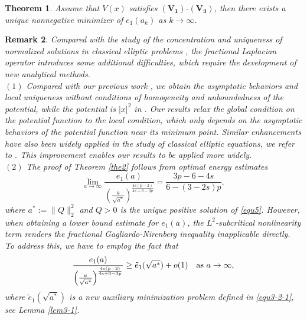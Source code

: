 \documentclass[reqno, 11pt]{amsart} %
\numberwithin{equation}{section}
\newtheorem{theorem}{Theorem}[section]
\newtheorem{remark}[theorem]{Remark}
\begin{document}
	\begin{theorem}\label{the3}
		Assume that $V(x)$ satisfies $\mathbf{(V_1)}$-$\mathbf{(V_3)}$, then there exists a unique nonnegative minimizer of $e_{1}(a_{k})$ as $k\rightarrow\infty$.
	\end{theorem}
	\begin{remark}
	\rm 	 Compared with the study of the concentration and uniqueness of normalized solutions in classical elliptic problems \cite{GSIM,GJDE,LZ,WZDCDS}, the fractional Laplacian operator introduces some additional difficulties, which require the development of new analytical methods.\\
	$(1)$ Compared with our previous work \cite{LIUYANG}, we obtain the asymptotic behaviors and local uniqueness without conditions of homogeneity and unboundedness of the potential, while the potential is $|x|^2$ in \cite{LIUYANG}. Our results relax the global condition on the potential function to the local condition, which only depends on the asymptotic behaviors of the potential function near its minimum point. Similar enhancements have also been widely applied in the study of classical elliptic equations, we refer to \cite{DWY,LiWeiYang}. This improvement enables our results to be applied more widely.\\ 
	$(2)$ The proof of Theorem \ref{the2} follows from optimal energy estimates 
	\begin{equation*}
		\lim_{a\rightarrow\infty}\frac{e_{1}(a)}{\left(\frac{a}{\sqrt{a^{\ast}}}\right)^{\frac{4s(p-2)}{4s+6-3p}}}=\frac{3p-6-4s}{6-(3-2s)p},
	\end{equation*}
	where $a^{\ast}:=\|Q\|_{2}^{2}$ and $Q>0$ is the unique positive solution of \eqref{equ5}. However, when obtaining a lower bound estimate for $e_{1}(a)$, the $L^{2}$-subcritical nonlinearity term renders the fractional Gagliardo-Nirenberg inequality inapplicable directly. To address this, we have to employ the fact that
	\begin{equation*}
		\frac{e_{1}(a)}{\left(\frac{a}{\sqrt{a^{\ast}}}\right)^{\frac{4s(p-2)}{4s+6-3p}}}\geq\tilde{e}_{1}(\sqrt{a^{\ast}})+o(1)\quad \hbox{as $a\rightarrow\infty$},
	\end{equation*} 
	where $\tilde{e}_{1}(\sqrt{a^{\ast}})$ is a new auxiliary minimization problem defined in \eqref{equ3-2-1}, see Lemma \ref{lem3-1}.\\

\end{remark}
\end{document}
